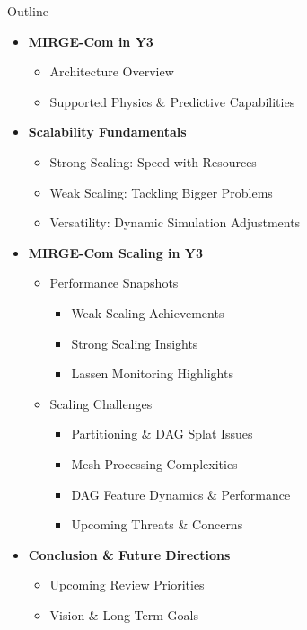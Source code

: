 \begin{frame}{Outline}
\begin{itemize}
    \item \textbf{MIRGE-Com in Y3}
    \begin{itemize}
        \item Architecture Overview
        \item Supported Physics \& Predictive Capabilities
    \end{itemize}
    
    \item \textbf{Scalability Fundamentals}
    \begin{itemize}
        \item Strong Scaling: Speed with Resources
        \item Weak Scaling: Tackling Bigger Problems
        \item Versatility: Dynamic Simulation Adjustments
    \end{itemize}
    
    \item \textbf{MIRGE-Com Scaling in Y3}
    \begin{itemize}
        \item Performance Snapshots
        \begin{itemize}
            \item Weak Scaling Achievements
            \item Strong Scaling Insights
            \item Lassen Monitoring Highlights
        \end{itemize}
        \item Scaling Challenges
        \begin{itemize}
            \item Partitioning \& DAG Splat Issues
            \item Mesh Processing Complexities
            \item DAG Feature Dynamics \& Performance
            \item Upcoming Threats \& Concerns
        \end{itemize}
    \end{itemize}
    
    \item \textbf{Conclusion \& Future Directions}
    \begin{itemize}
        \item Upcoming Review Priorities
        \item Vision \& Long-Term Goals
    \end{itemize}
\end{itemize}
\end{frame}

